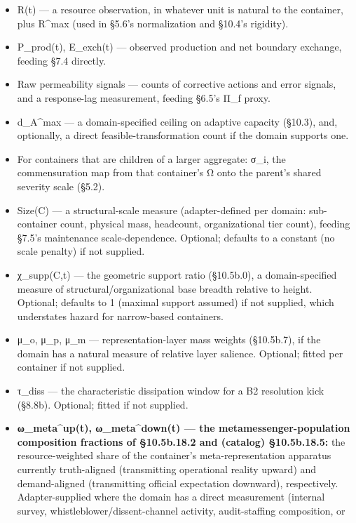 \documentclass[
]{article}
\begin{document}
\begin{itemize}
\item
  R(t) --- a resource observation, in whatever unit is natural to the
  container, plus R\^{}max (used in §5.6's normalization and §10.4's
  rigidity).
\item
  P\_prod(t), E\_exch(t) --- observed production and net boundary
  exchange, feeding §7.4 directly.
\item
  Raw permeability signals --- counts of corrective actions and error
  signals, and a response-lag measurement, feeding §6.5's Π\_f proxy.
\item
  d\_A\^{}max --- a domain-specified ceiling on adaptive capacity
  (§10.3), and, optionally, a direct feasible-transformation count if
  the domain supports one.
\item
  For containers that are children of a larger aggregate: σ\_i, the
  commensuration map from that container's Ω onto the parent's shared
  severity scale (§5.2).
\item
  Size(C) --- a structural-scale measure (adapter-defined per domain:
  sub-container count, physical mass, headcount, organizational tier
  count), feeding §7.5's maintenance scale-dependence. Optional;
  defaults to a constant (no scale penalty) if not supplied.
\item
  χ\_supp(C,t) --- the geometric support ratio (§10.5b.0), a
  domain-specified measure of structural/organizational base breadth
  relative to height. Optional; defaults to 1 (maximal support assumed)
  if not supplied, which understates hazard for narrow-based containers.
\item
  μ\_o, μ\_p, μ\_m --- representation-layer mass weights (§10.5b.7), if
  the domain has a natural measure of relative layer salience. Optional;
  fitted per container if not supplied.
\item
  τ\_diss --- the characteristic dissipation window for a B2 resolution
  kick (§8.8b). Optional; fitted if not supplied.
\item
  \textbf{ω\_meta\^{}up(t), ω\_meta\^{}down(t) --- the
  metamessenger-population composition fractions of §10.5b.18.2 and
  (catalog) §10.5b.18.5:} the resource-weighted share of the container's
  meta-representation apparatus currently truth-aligned (transmitting
  operational reality upward) and demand-aligned (transmitting official
  expectation downward), respectively. Adapter-supplied where the domain
  has a direct measurement (internal survey,
  whistleblower/dissent-channel activity, audit-staffing composition, or

\end{itemize}
\end{document}

